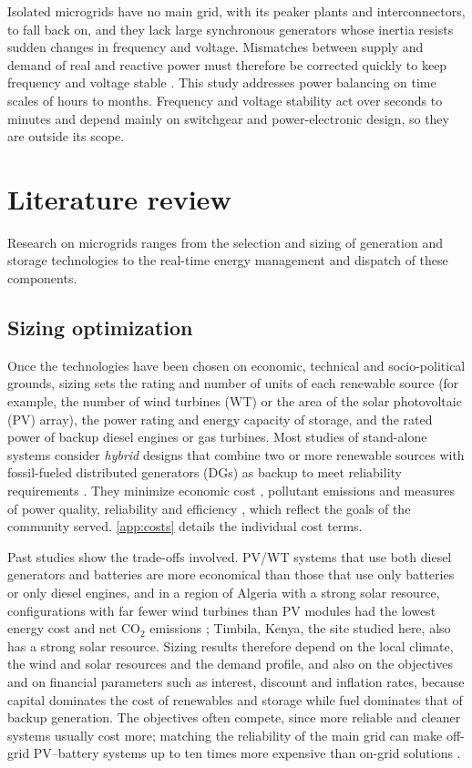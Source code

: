 \documentclass[final,3p,times]{elsarticle}
\begin{document}
Isolated microgrids have no main grid, with its peaker plants and interconnectors, to fall back on, and they lack large synchronous generators whose inertia resists sudden changes in frequency and voltage. Mismatches between supply and demand of real and reactive power must therefore be corrected quickly to keep frequency and voltage stable \cite{tech_challenges}. This study addresses power balancing on time scales of hours to months. Frequency and voltage stability act over seconds to minutes and depend mainly on switchgear and power-electronic design, so they are outside its scope.

\section{Literature review}

Research on microgrids ranges from the selection and sizing of generation and storage technologies to the real-time energy management and dispatch of these components.

\subsection{Sizing optimization}

Once the technologies have been chosen on economic, technical and socio-political grounds, sizing sets the rating and number of units of each renewable source (for example, the number of wind turbines (WT) or the area of the solar photovoltaic (PV) array), the power rating and energy capacity of storage, and the rated power of backup diesel engines or gas turbines. Most studies of stand-alone systems consider \textit{hybrid} designs that combine two or more renewable sources with fossil-fueled distributed generators (DGs) as backup to meet reliability requirements \cite{kaabeche2014} \cite{bhandari2014}. They minimize economic cost \cite{tazvinga2013}, pollutant emissions and measures of power quality, reliability and efficiency \cite{kaabeche2011a}, which reflect the goals of the community served. \cref{app:costs} details the individual cost terms.
 
Past studies show the trade-offs involved. PV/WT systems that use both diesel generators and batteries are more economical than those that use only batteries or only diesel engines, and in a region of Algeria with a strong solar resource, configurations with far fewer wind turbines than PV modules had the lowest energy cost and net CO$_2$ emissions \cite{kaabeche2014}; Timbila, Kenya, the site studied here, also has a strong solar resource. Sizing results therefore depend on the local climate, the wind and solar resources and the demand profile, and also on the objectives and on financial parameters such as interest, discount and inflation rates, because capital dominates the cost of renewables and storage while fuel dominates that of backup generation. The objectives often compete, since more reliable and cleaner systems usually cost more; matching the reliability of the main grid can make off-grid PV--battery systems up to ten times more expensive than on-grid solutions \cite{weng2016}.
\end{document}
